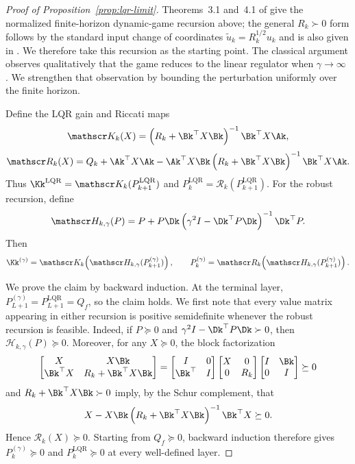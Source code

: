 \begin{proof}[Proof of Proposition~\ref{prop:lqr-limit}]
Theorems~3.1 and~4.1 of \citet{basar1991dynamic} give the normalized
finite-horizon dynamic-game recursion above; the general $R_k\succ0$ form
follows by the standard input change of coordinates
$\tilde u_k=R_k^{1/2}u_k$ and is also given in
\citet[Ch.~9]{hassibi1999indefinite}. We therefore take this recursion as the
starting point. The classical argument observes qualitatively that the game
reduces to the linear regulator when $\gamma\to\infty$
\citep[proof of Thm.~5.2]{basar1991dynamic}. We strengthen that observation by
bounding the perturbation uniformly over the finite horizon.

Define the LQR gain and Riccati maps
$$
\mathscr K_k(X)
=
\left(R_k+\Bk^\top X\Bk\right)^{-1}\Bk^\top X\Ak,
$$
$$
\mathscr R_k(X)
=
Q_k+\Ak^\top X\Ak
-\Ak^\top X\Bk
\left(R_k+\Bk^\top X\Bk\right)^{-1}
\Bk^\top X\Ak.
$$
Thus
$\Kk^{\mathrm{LQR}}=\mathscr K_k(P_{k+1}^{\mathrm{LQR}})$ and
$P_k^{\mathrm{LQR}}=\mathscr R_k(P_{k+1}^{\mathrm{LQR}})$.
For the robust recursion, define
$$
\mathscr H_{k,\gamma}(P)
=
P+P\Dk
\left(\gamma^2I-\Dk^\top P\Dk\right)^{-1}
\Dk^\top P.
$$
Then
$$
\Kk^{(\gamma)}
=
\mathscr K_k\!\left(
\mathscr H_{k,\gamma}(P_{k+1}^{(\gamma)})
\right),
\qquad
P_k^{(\gamma)}
=
\mathscr R_k\!\left(
\mathscr H_{k,\gamma}(P_{k+1}^{(\gamma)})
\right).
$$

We prove the claim by backward induction.  At the terminal layer,
$P_{L+1}^{(\gamma)}=P_{L+1}^{\mathrm{LQR}}=Q_f$, so the claim holds.
We first note that every value matrix appearing in either recursion is
positive semidefinite whenever the robust recursion is feasible.  Indeed, if
$P\succeq0$ and
$\gamma^2I-\Dk^\top P\Dk\succ0$, then
$\mathscr H_{k,\gamma}(P)\succeq0$.  Moreover, for any $X\succeq0$,
the block factorization
$$
\begin{bmatrix}
X & X\Bk\\
\Bk^\top X & R_k+\Bk^\top X\Bk
\end{bmatrix}
=
\begin{bmatrix}
I&0\\
\Bk^\top&I
\end{bmatrix}
\begin{bmatrix}
X&0\\
0&R_k
\end{bmatrix}
\begin{bmatrix}
I&\Bk\\
0&I
\end{bmatrix}
\succeq0
$$
and $R_k+\Bk^\top X\Bk\succ0$ imply, by the Schur complement, that
$$
X-X\Bk
\left(R_k+\Bk^\top X\Bk\right)^{-1}
\Bk^\top X
\succeq0.
$$
Hence $\mathscr R_k(X)\succeq0$.  Starting from $Q_f\succeq0$, backward
induction therefore gives
$P_k^{(\gamma)}\succeq0$ and $P_k^{\mathrm{LQR}}\succeq0$ at every
well-defined layer.


\end{proof}
